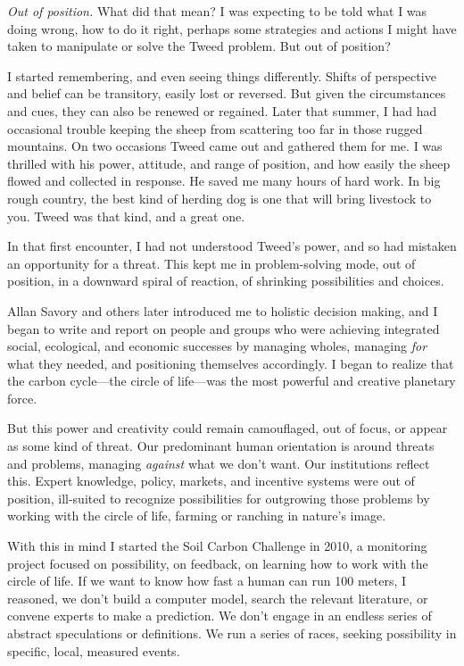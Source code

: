 \documentclass[11pt,letterpaper,twoside,onecolumn]{memoir}
\begin{document}
\textit{Out of position.} What did that mean? I was expecting to be told what I was doing wrong, how to do it right, perhaps some strategies and actions I might have taken to manipulate or solve the Tweed problem. But out of position?

I started remembering, and even seeing things differently. Shifts of perspective and belief can be transitory, easily lost or reversed. But given the circumstances and cues, they can also be renewed or regained. Later that summer, I had had occasional trouble keeping the sheep from scattering too far in those rugged mountains. On two occasions Tweed came out and gathered them for me. I was thrilled with his power, attitude, and range of position, and how easily the sheep flowed and collected in response. He saved me many hours of hard work. In big rough country, the best kind of herding dog is one that will bring livestock to you. Tweed was that kind, and a great one.

In that first encounter, I had not understood Tweed's power, and so had mistaken an opportunity for a threat. This kept me in problem-solving mode, out of position, in a downward spiral of reaction, of shrinking possibilities and choices.

Allan Savory and others later introduced me to holistic decision making, and I began to write and report on people and groups who were achieving integrated social, ecological, and economic successes by managing wholes, managing \textit{for} what they needed, and positioning themselves accordingly. I began to realize that the carbon cycle---the circle of life---was the most powerful and creative planetary force.

But this power and creativity could remain camouflaged, out of focus, or appear as some kind of threat. Our predominant human orientation is around threats and problems, managing \textit{against} what we don't want. Our institutions reflect this. Expert knowledge, policy, markets, and incentive systems were out of position, ill-suited to recognize possibilities for outgrowing those problems by working with the circle of life, farming or ranching in nature's image.

With this in mind I started the Soil Carbon Challenge in 2010, a monitoring project focused on possibility, on feedback, on learning how to work with the circle of life. If we want to know how fast a human can run 100 meters, I reasoned, we don't build a computer model, search the relevant literature, or convene experts to make a prediction. We don't engage in an endless series of abstract speculations or definitions. We run a series of races, seeking possibility in specific, local, measured events.
\end{document}
